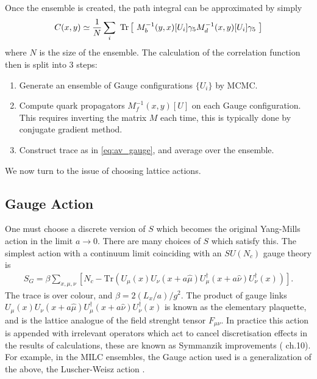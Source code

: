 \documentclass[a4paper,10pt]{article}
\numberwithin{equation}{section}
\begin{document}
\\ \\
Once the ensemble is created, the path integral can be approximated by simply
\begin{align}
  C(x,y) \simeq {1\over N} \sum_i \text{ Tr}\left[\text{ } M^{-1}_b(y,x)[U_i] \gamma_5 M^{-1}_d(x,y)[U_i] \gamma_5 \text{ }\right]
  \label{eq:av_gauge}
\end{align}
where $N$ is the size of the ensemble. The calculation of the correlation function then is split into 3 steps:
\begin{enumerate}
	\item
	Generate an ensemble of Gauge configurations $\{ U_i \}$ by MCMC.
	\item
	Compute quark propagators $M^{-1}_f(x,y)[U]$ on each Gauge configuration. This requires inverting the matrix $M$ each time, this is typically done by conjugate gradient method.
	\item
	Construct trace as in \eqref{eq:av_gauge}, and average over the ensemble.
\end{enumerate}
We now turn to the issue of choosing lattice actions.

\subsection{Gauge Action}
\label{sec:gauge}

One must choose a discrete version of $S$ which becomes the original Yang-Mills action in the limit $a\to0$. There are many choices of $S$ which satisfy this. The simplest action with a continuum limit coinciding with an $SU(N_c)$ gauge theory is
\begin{align}
   S_G = \beta \sum_{x,\mu,\nu} \left[ N_c - \text{Tr}\left( U_{\mu}(x) U_{\nu}(x+a\hat{\mu}) U^{\dagger}_{\mu}(x+a\hat{\nu}) U^{\dagger}_{\nu}(x) \right)  \right].
\end{align}
The trace is over colour, and $\beta = 2(L_x/a)/g^2$. The product of gauge links $U_{\mu}(x) U_{\nu}(x+a\hat{\mu}) U^{\dagger}_{\mu}(x+a\hat{\nu})U^{\dagger}_{\nu}(x)$ is known as the elementary plaquette, and is the lattice analogue of the field strenght tensor $F_{\mu\nu}$.
In practice this action is appended with irrelevant operators which act to cancel discretisation effects in the results of calculations, these are known as Symmanzik improvements (\cite{DeGrand:2006zz} ch.10). 
For example, in the MILC ensembles, the Gauge action used is a generalization of the above, the Luscher-Weisz action \cite{Gattringer:2001ia}.
\end{document}

